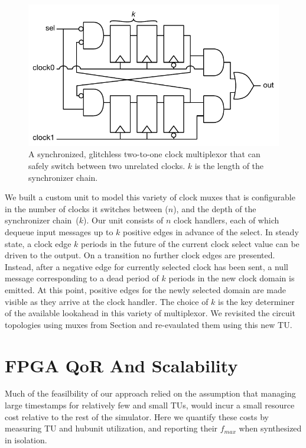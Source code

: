 \begin{figure}
    \centering
    \captionsetup{margin=0.25cm}
    \includegraphics[width=0.6\columnwidth]{figures/clock-mux-sync.pdf}
    \caption{A synchronized, glitchless two-to-one clock multiplexor that can safely switch between two unrelated clocks.
    $k$ is the length of the synchronizer chain.}
    \label{fig:clock-mux-sync}
\end{figure}

We built a custom unit to model this variety of clock muxes that is
configurable in the number of clocks it switches between ($n$), and the depth
of the synchronizer chain~($k$). Our unit consists of $n$ clock handlers, each
of which dequeue input messages up to $k$ positive edges in advance of the
select.  In steady state, a clock edge $k$ periods in the future of the current
clock select value can be driven to the output.  On a transition no further
clock edges are presented. Instead, after a negative edge for currently
selected clock has been sent, a null message corresponding to a dead period of
$k$ periods in the new clock domain is emitted. At this point, positive edges
for the newly selected domain are made visible as they arrive at the clock
handler. The choice of $k$ is the key determiner of the available lookahead in
this variety of multiplexor. We revisited the circuit topologies using muxes
from Section and re-evaulated them using this new TU.

\section{FPGA QoR And Scalability}

Much of the feasilbility of our approach relied on the assumption that managing
large timestamps for relatively few and small TUs, would incur a small resource
cost relative to the rest of the simulator. Here we quantify these costs by
measuring TU and hubunit utilization, and reporting their $f_{max}$ when
synthesized in isolation.

